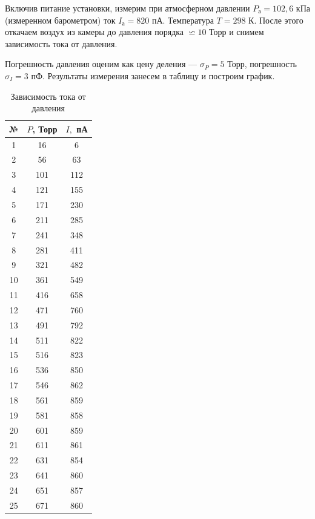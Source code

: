 \documentclass[12pt]{kiarticle}
\begin{document}
		Включив питание установки, измерим при атмосферном давлении $ P_а = 102,6 $ кПа (измеренном барометром) ток $ I_а = 820 $ пА. Температура $ T = 298 $ К. После этого откачаем воздух из камеры до давления порядка $ \backsimeq 10 $ Торр и снимем зависимость тока от давления.
		
		Погрешность давления оценим как цену деления --- $ \sigma_P = 5 $ Торр, погрешность $ \sigma_I = 3 $ пФ. Результаты измерения занесем в таблицу и построим график.
		
			\begin{table}[h!]
			\caption{Зависимость тока от давления}
			\begin{center}
				\begin{tabular}{|c|c|c|}
					\hline 
					№ & $ P $, Торр & $ I, $ пА  \\ 
					\hline 
				1 & 16 & 6 \\
				2 & 56 & 63 \\
				3 & 101 & 112 \\
				4 & 121 & 155 \\
				5 & 171 & 230 \\
				6 & 211 & 285 \\
				7 & 241 & 348 \\
				8 & 281 & 411 \\
				9 & 321 & 482 \\
				10 & 361 & 549 \\
				11 & 416 & 658 \\
				12 & 471 & 760 \\
				13 & 491 & 792 \\
				14 & 511 & 822 \\
				15 & 516 & 823 \\
				16 & 536 & 850 \\
				17 & 546 & 862 \\
				18 & 561 & 859 \\
				19 & 581 & 858 \\
				20 & 601 & 859 \\
				21 & 611 & 861 \\
				22 & 631 & 854 \\
				23 & 641 & 860 \\
				24 & 651 & 857 \\
				25 & 671 & 860 \\
					\hline 
				\end{tabular} 
			\end{center}
			\label{table ion}
		\end{table}
	
\end{document}
